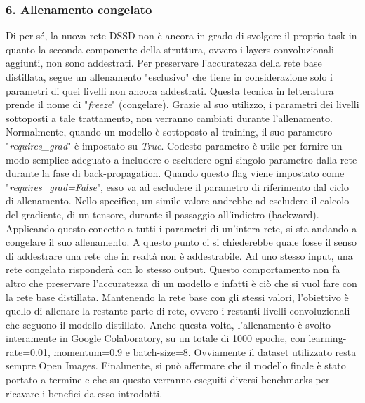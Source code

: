 \subsubsection{6. Allenamento congelato}
Di per sé, la nuova rete DSSD non è ancora in grado di svolgere il proprio task in quanto la seconda componente della struttura, ovvero i layers convoluzionali aggiunti, non sono addestrati. Per preservare l'accuratezza della rete base distillata, segue un allenamento "esclusivo" che tiene in considerazione solo i parametri di quei livelli non ancora addestrati. Questa tecnica in letteratura prende il nome di "\emph{freeze}" (congelare). Grazie al suo utilizzo, i parametri dei livelli sottoposti a tale trattamento, non verranno cambiati durante l'allenamento. Normalmente, quando un modello è sottoposto al training, il suo parametro "\emph{requires\_grad}" è impostato su \emph{True}. Codesto parametro è utile per fornire un modo semplice adeguato a includere o escludere ogni singolo parametro dalla rete durante la fase di back-propagation. Quando questo flag viene impostato come "\emph{requires\_grad=False}", esso va ad escludere il parametro di riferimento dal ciclo di allenamento. Nello specifico, un simile valore andrebbe ad escludere il calcolo del gradiente, di un tensore, durante il passaggio all'indietro (backward). Applicando questo concetto a tutti i parametri di un'intera rete, si sta andando a congelare il suo allenamento. A questo punto ci si chiederebbe quale fosse il senso di addestrare una rete che in realtà non è addestrabile. Ad uno stesso input, una rete congelata risponderà con lo stesso output. Questo comportamento non fa altro che preservare l'accuratezza di un modello e infatti è ciò che si vuol fare con la rete base distillata. Mantenendo la rete base con gli stessi valori, l'obiettivo è quello di allenare la restante parte di rete, ovvero i restanti livelli convoluzionali che seguono il modello distillato. Anche questa volta, l'allenamento è svolto interamente in Google Colaboratory, su un totale di 1000 epoche, con learning-rate=0.01, momentum=0.9 e batch-size=8. Ovviamente il dataset utilizzato resta sempre Open Images. Finalmente, si può affermare che il modello finale è stato portato a termine e che su questo verranno eseguiti diversi benchmarks per ricavare i benefici da esso introdotti.  

